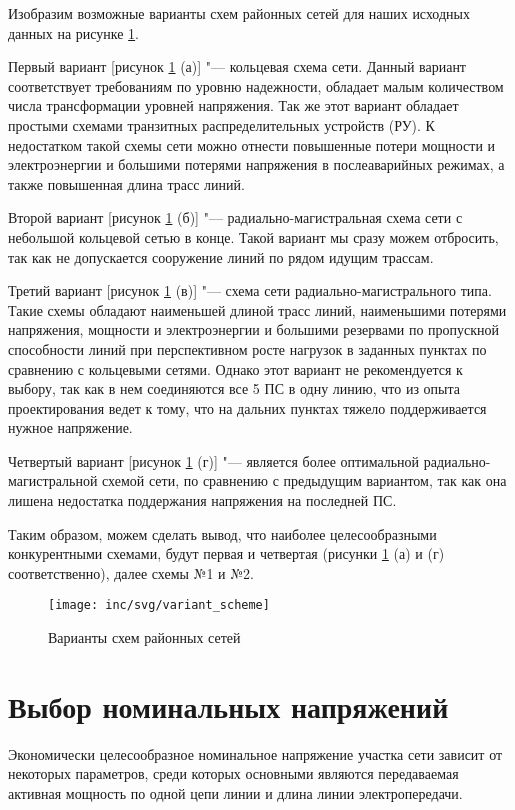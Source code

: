 Изобразим возможные варианты схем районных сетей для наших исходных данных на рисунке \ref{fig:variant_scheme}.

Первый вариант [рисунок \ref{fig:variant_scheme} (а)] "--- кольцевая схема сети. Данный вариант соответствует требованиям по уровню надежности, обладает малым количеством числа трансформации уровней напряжения. Так же этот вариант обладает простыми схемами транзитных распределительных устройств (РУ). К недостатком такой схемы сети можно отнести повышенные потери мощности и электроэнергии и большими потерями напряжения в послеаварийных режимах, а также повышенная длина трасс линий.

Второй вариант [рисунок \ref{fig:variant_scheme} (б)] "--- радиально-магистральная схема сети с небольшой кольцевой сетью в конце. Такой вариант мы сразу можем отбросить, так как не допускается сооружение линий по рядом идущим трассам.

Третий вариант [рисунок \ref{fig:variant_scheme} (в)] "--- схема сети радиально-магистрального типа. Такие схемы обладают наименьшей длиной трасс линий, наименьшими потерями напряжения, мощности и электроэнергии и большими резервами по пропускной способности линий при перспективном росте нагрузок в заданных пунктах по сравнению с кольцевыми сетями. Однако этот вариант не рекомендуется к выбору, так как в нем соединяются все 5 ПС в одну линию, что из опыта проектирования ведет к тому, что на дальних пунктах тяжело поддерживается нужное напряжение.

Четвертый вариант [рисунок \ref{fig:variant_scheme} (г)] "--- является более оптимальной радиально-магистральной схемой сети, по сравнению с предыдущим вариантом, так как она лишена недостатка поддержания напряжения на последней ПС.

Таким образом, можем сделать вывод, что наиболее целесообразными конкурентными схемами, будут первая и четвертая (рисунки \ref{fig:variant_scheme} (а) и (г) соответственно), далее схемы №1 и №2.

\begin{figure}[h]
	\centering
	\texttt{[image: inc/svg/variant\_scheme]}
	\caption{Варианты схем районных сетей}
	\label{fig:variant_scheme}
\end{figure}


\section{Выбор номинальных напряжений}

Экономически целесообразное номинальное напряжение участка сети зависит от некоторых параметров, среди которых основными являются передаваемая активная мощность по одной цепи линии и длина линии электропередачи.

